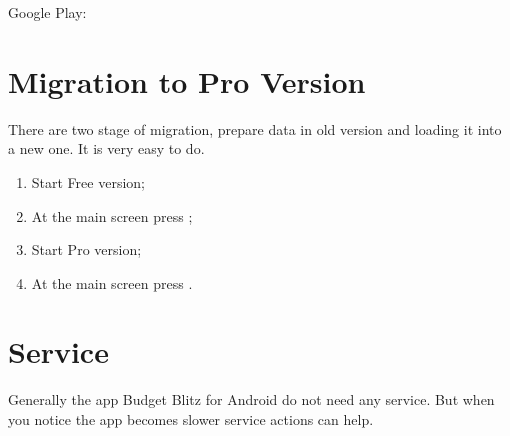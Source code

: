 \documentclass[a4paper,10pt,english]{sphinxmanual}
\begin{document}
\sphinxAtStartPar
Google Play:

\sphinxAtStartPar
{}

\sphinxAtStartPar
{}

\sphinxstepscope


\chapter{Migration to Pro Version}
\label{\detokenize{migration-to-pro:migration-to-pro-version}}\label{\detokenize{migration-to-pro:chapter-migration-to-pro}}\label{\detokenize{migration-to-pro::doc}}
\sphinxAtStartPar
There are two stage of migration, prepare data in old version and loading it into a new one.
It is very easy to do.
\begin{enumerate}
%
\item {} 
\sphinxAtStartPar
Start Free version;

\item {} 
\sphinxAtStartPar
At the main screen press ;

\item {} 
\sphinxAtStartPar
Start Pro version;

\item {} 
\sphinxAtStartPar
At the main screen press .

\end{enumerate}

\sphinxstepscope


\chapter{Service}
\label{\detokenize{service:service}}\label{\detokenize{service:chapter-service}}\label{\detokenize{service::doc}}
\sphinxAtStartPar
Generally the app Budget Blitz for Android do not need any service. But when you notice
the app becomes slower service actions can help.

\noindent{}

\noindent{}
\end{document}
